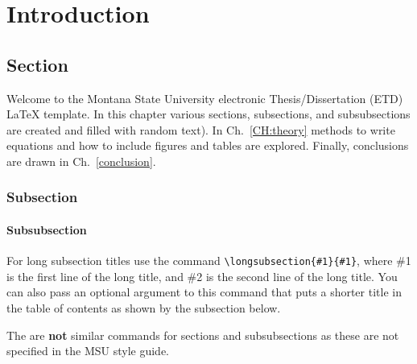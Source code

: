 \chapter{Introduction}\label{CH:introduction}


\section{Section}\label{Sect:test}
Welcome to the Montana State University electronic Thesis/Dissertation (ETD) \LaTeX{} template.  In this chapter various sections, subsections, and subsubsections are created and filled with random text).  In Ch.~\ref{CH:theory} methods to write equations and how to include figures and tables are explored.  Finally, conclusions are drawn in Ch.~\ref{conclusion}.

\subsection{Subsection}\label{Sect:testsub}
\lipsum[2] %

\subsubsection{Subsubsection}\label{Sect:testsubsub}
\lipsum[3] %

\label{Sect:longsub}
For long subsection titles use the command \verb|\longsubsection{#1}{#1}|, where \#1 is the first line of the long title, and \#2 is the second line of the long title. You can also pass an optional argument to this command that puts a shorter title in the table of contents as shown by the subsection below.

\label{Sect:longsub2}
The are \textbf{not} similar commands for sections and subsubsections as these are not specified in the MSU style guide.  



